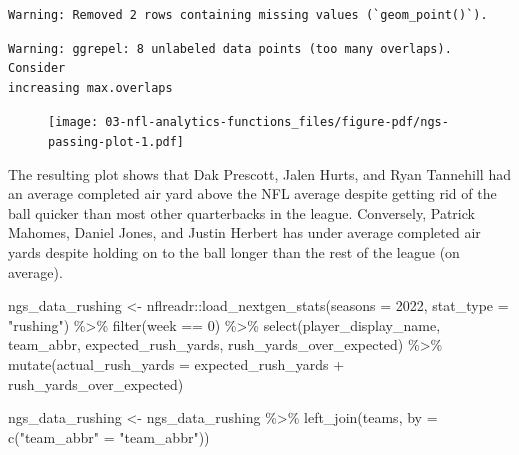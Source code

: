 \documentclass[
  letterpaper,
]{krantz}
\newenvironment{Shaded}{\begin{snugshade}}{\end{snugshade}}
\newcommand{\AttributeTok}[1]{\textcolor[rgb]{0.40,0.45,0.13}{#1}}
\newcommand{\DecValTok}[1]{\textcolor[rgb]{0.68,0.00,0.00}{#1}}
\newcommand{\FunctionTok}[1]{\textcolor[rgb]{0.28,0.35,0.67}{#1}}
\newcommand{\NormalTok}[1]{\textcolor[rgb]{0.00,0.23,0.31}{#1}}
\newcommand{\OtherTok}[1]{\textcolor[rgb]{0.00,0.23,0.31}{#1}}
\newcommand{\SpecialCharTok}[1]{\textcolor[rgb]{0.37,0.37,0.37}{#1}}
\newcommand{\StringTok}[1]{\textcolor[rgb]{0.13,0.47,0.30}{#1}}
\begin{document}
\begin{verbatim}
Warning: Removed 2 rows containing missing values (`geom_point()`).
\end{verbatim}

\begin{verbatim}
Warning: ggrepel: 8 unlabeled data points (too many overlaps). Consider
increasing max.overlaps
\end{verbatim}

\begin{figure}[H]

{\centering \texttt{[image: 03-nfl-analytics-functions\_files/figure-pdf/ngs-passing-plot-1.pdf]}

}

\end{figure}

The resulting plot shows that Dak Prescott, Jalen Hurts, and Ryan
Tannehill had an average completed air yard above the NFL average
despite getting rid of the ball quicker than most other quarterbacks in
the league. Conversely, Patrick Mahomes, Daniel Jones, and Justin
Herbert has under average completed air yards despite holding on to the
ball longer than the rest of the league (on average).

\begin{Shaded}
\begin{Highlighting}[]
\NormalTok{ngs\_data\_rushing }\OtherTok{\textless{}{-}}\NormalTok{ nflreadr}\SpecialCharTok{::}\FunctionTok{load\_nextgen\_stats}\NormalTok{(}\AttributeTok{seasons =} \DecValTok{2022}\NormalTok{,}
                                                 \AttributeTok{stat\_type =} \StringTok{"rushing"}\NormalTok{) }\SpecialCharTok{\%\textgreater{}\%}
  \FunctionTok{filter}\NormalTok{(week }\SpecialCharTok{==} \DecValTok{0}\NormalTok{) }\SpecialCharTok{\%\textgreater{}\%}
  \FunctionTok{select}\NormalTok{(player\_display\_name, team\_abbr, expected\_rush\_yards,}
\NormalTok{         rush\_yards\_over\_expected) }\SpecialCharTok{\%\textgreater{}\%}
  \FunctionTok{mutate}\NormalTok{(}\AttributeTok{actual\_rush\_yards =}\NormalTok{ expected\_rush\_yards }\SpecialCharTok{+}\NormalTok{ rush\_yards\_over\_expected)}

\NormalTok{ngs\_data\_rushing }\OtherTok{\textless{}{-}}\NormalTok{ ngs\_data\_rushing }\SpecialCharTok{\%\textgreater{}\%}
  \FunctionTok{left\_join}\NormalTok{(teams, }\AttributeTok{by =} \FunctionTok{c}\NormalTok{(}\StringTok{"team\_abbr"} \OtherTok{=} \StringTok{"team\_abbr"}\NormalTok{))}
\end{Highlighting}
\end{Shaded}
\end{document}
